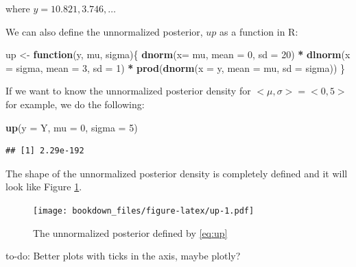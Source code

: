 \documentclass[12pt,]{krantz}
\makeatletter
\newenvironment{Shaded}{\begin{snugshade}}{\end{snugshade}}
\newcommand{\KeywordTok}[1]{\textcolor[rgb]{0.13,0.29,0.53}{\textbf{#1}}}
\newcommand{\DataTypeTok}[1]{\textcolor[rgb]{0.13,0.29,0.53}{#1}}
\newcommand{\DecValTok}[1]{\textcolor[rgb]{0.00,0.00,0.81}{#1}}
\newcommand{\StringTok}[1]{\textcolor[rgb]{0.31,0.60,0.02}{#1}}
\newcommand{\ControlFlowTok}[1]{\textcolor[rgb]{0.13,0.29,0.53}{\textbf{#1}}}
\newcommand{\OperatorTok}[1]{\textcolor[rgb]{0.81,0.36,0.00}{\textbf{#1}}}
\newcommand{\NormalTok}[1]{#1}
\newenvironment{kframe}{%
\medskip{}
\setlength{\fboxsep}{.8em}
 \def\at@end@of@kframe{}%
 \ifinner\ifhmode%
  \def\at@end@of@kframe{\end{minipage}}%
  \begin{minipage}{\columnwidth}%
 \fi\fi%
 \def\FrameCommand##1{\hskip\@totalleftmargin \hskip-\fboxsep
 \colorbox{shadecolor}{##1}\hskip-\fboxsep
     \hskip-\linewidth \hskip-\@totalleftmargin \hskip\columnwidth}%
 \MakeFramed {\advance\hsize-\width
   \@totalleftmargin\z@ \linewidth\hsize
   \@setminipage}}%
 {\par\unskip\endMakeFramed%
 \at@end@of@kframe}
\newenvironment{rmdblock}[1]
  {
  \begin{itemize}
  \renewcommand{\labelitemi}{
    \raisebox{-.7\height}[0pt][0pt]{
      {\setkeys{Gin}{width=3em,keepaspectratio}\texttt{[image: images/\#1]}}
    }
  }
  \setlength{\fboxsep}{1em}
  \begin{kframe}
  \item
  }
  {
  \end{kframe}
  \end{itemize}
  }
\newenvironment{rmdnote}
  {\begin{rmdblock}{note}}
  {\end{rmdblock}}
\theoremstyle{definition}
\theoremstyle{definition}
\theoremstyle{definition}
\theoremstyle{remark}
\makeatother
\begin{document}
where \(y = {10.821, 3.746, \ldots}\)

We can also define the unnormalized posterior, \(up\) as a function in
R:

\begin{Shaded}
\begin{Highlighting}[]
\NormalTok{up <-}\StringTok{ }\ControlFlowTok{function}\NormalTok{(y, mu, sigma)\{}
  \KeywordTok{dnorm}\NormalTok{(}\DataTypeTok{x=}\NormalTok{ mu, }\DataTypeTok{mean =} \DecValTok{0}\NormalTok{, }\DataTypeTok{sd =} \DecValTok{20}\NormalTok{) }\OperatorTok{*}
\StringTok{    }\KeywordTok{dlnorm}\NormalTok{(}\DataTypeTok{x =}\NormalTok{ sigma, }\DataTypeTok{mean =} \DecValTok{3}\NormalTok{, }\DataTypeTok{sd =} \DecValTok{1}\NormalTok{) }\OperatorTok{*}
\StringTok{    }\KeywordTok{prod}\NormalTok{(}\KeywordTok{dnorm}\NormalTok{(}\DataTypeTok{x =}\NormalTok{ y, }\DataTypeTok{mean =}\NormalTok{ mu, }\DataTypeTok{sd =}\NormalTok{ sigma))}
\NormalTok{\}}
\end{Highlighting}
\end{Shaded}

If we want to know the unnormalized posterior density for
\(<\mu,\sigma> = <0, 5>\) for example, we do the following:

\begin{Shaded}
\begin{Highlighting}[]
\KeywordTok{up}\NormalTok{(}\DataTypeTok{y =}\NormalTok{ Y, }\DataTypeTok{mu =} \DecValTok{0}\NormalTok{, }\DataTypeTok{sigma =} \DecValTok{5}\NormalTok{)}
\end{Highlighting}
\end{Shaded}

\begin{verbatim}
## [1] 2.29e-192
\end{verbatim}

The shape of the unnormalized posterior density is completely defined
and it will look like Figure \ref{fig:up}.



\begin{figure}
\centering
\texttt{[image: bookdown\_files/figure-latex/up-1.pdf]}
\caption{\label{fig:up}The unnormalized posterior defined by \eqref{eq:up}}
\end{figure}

\begin{rmdnote} to-do: Better plots with ticks in the axis,
maybe plotly? \end{rmdnote}
\end{document}
